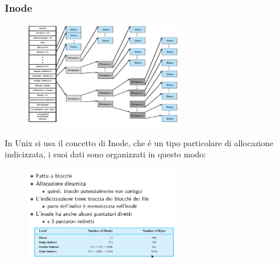 \subsubsection*{Inode}
\begin{figure}[H]
    \centering
    \includegraphics[width=0.6\textwidth]{immagini/Inode}
\end{figure}
In Unix si usa il concetto di Inode, che é un tipo particolare di allocazione indicizzata, i suoi dati sono organizzati in questo modo:
\begin{figure}[H]
    \centering
    \includegraphics[width=0.6\textwidth]{immagini/Inode2}
\end{figure}